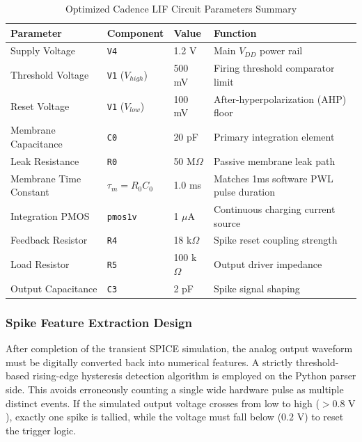 \documentclass{ieeeaccess}
\begin{document}
\begin{table}[H]
\centering
\caption{Optimized Cadence LIF Circuit Parameters Summary}
\label{tab:circuitparams}
\begin{tabular}{|p{}|p{}|p{}|p{}|}
\hline
\textbf{Parameter} & \textbf{Component} & \textbf{Value} & \textbf{Function} \\
\hline
Supply Voltage & \texttt{V4} & 1.2 V & Main $V_{DD}$ power rail \\
\hline
Threshold Voltage & \texttt{V1} ($V_{high}$) & 500 mV & Firing threshold comparator limit \\
\hline
Reset Voltage & \texttt{V1} ($V_{low}$) & 100 mV & After-hyperpolarization (AHP) floor \\
\hline
Membrane Capacitance & \texttt{C0} & 20 pF & Primary integration element \\
\hline
Leak Resistance & \texttt{R0} & 50 M$\Omega$ & Passive membrane leak path \\
\hline
Membrane Time Constant & $\tau_m = R_0C_0$ & 1.0 ms & Matches 1ms software PWL pulse duration \\
\hline
Integration PMOS & \texttt{pmos1v} & 1 $\mu$A & Continuous charging current source \\
\hline
Feedback Resistor & \texttt{R4} & 18 k$\Omega$ & Spike reset coupling strength \\
\hline
Load Resistor & \texttt{R5} & 100 k$\Omega$ & Output driver impedance \\
\hline
Output Capacitance & \texttt{C3} & 2 pF & Spike signal shaping \\
\hline
\end{tabular}
\end{table}

\subsubsection{Spike Feature Extraction Design}

After completion of the transient SPICE simulation, the analog output waveform must be digitally converted back into numerical features. A strictly threshold-based rising-edge hysteresis detection algorithm is employed on the Python parser side. This avoids erroneously counting a single wide hardware pulse as multiple distinct events. If the simulated output voltage crosses from low to high ($>0.8\text{ V}$), exactly one spike is tallied, while the voltage must fall below ($0.2\text{ V}$) to reset the trigger logic.
\end{document}
